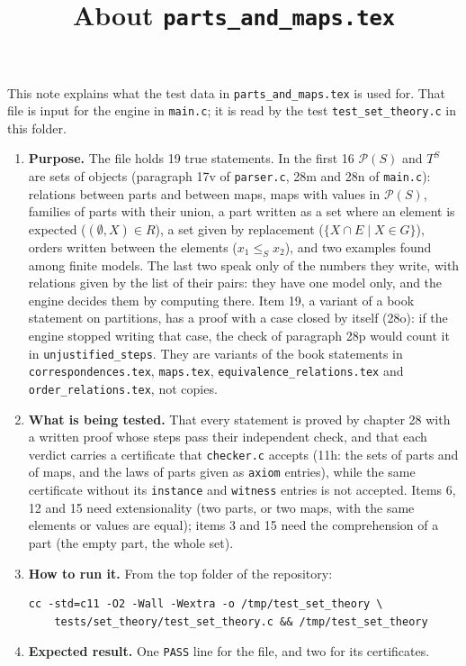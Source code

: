 \documentclass[11pt,a4paper]{article}
\title{About \texttt{parts\_and\_maps.tex}}
\author{}
\date{}
\begin{document}
\maketitle
This note explains what the test data in \texttt{parts\_and\_maps.tex} is used for. That file is input for the engine in \texttt{main.c}; it is read by the test \texttt{test\_set\_theory.c} in this folder.

\begin{enumerate}
\item \textbf{Purpose.} The file holds 19 true statements. In the first 16 $\mathcal{P}(S)$ and $T^{S}$ are sets of objects (paragraph 17v of \texttt{parser.c}, 28m and 28n of \texttt{main.c}): relations between parts and between maps, maps with values in $\mathcal{P}(S)$, families of parts with their union, a part written as a set where an element is expected ($(\emptyset, X) \in R$), a set given by replacement ($\{X \cap E \mid X \in G\}$), orders written between the elements ($x_{1} \le_{S} x_{2}$), and two examples found among finite models. The last two speak only of the numbers they write, with relations given by the list of their pairs: they have one model only, and the engine decides them by computing there. Item 19, a variant of a book statement on partitions, has a proof with a case closed by itself (28o): if the engine stopped writing that case, the check of paragraph 28p would count it in \texttt{unjustified\_steps}. They are variants of the book statements in \texttt{correspondences.tex}, \texttt{maps.tex}, \texttt{equivalence\_relations.tex} and \texttt{order\_relations.tex}, not copies.

\item \textbf{What is being tested.} That every statement is proved by chapter 28 with a written proof whose steps pass their independent check, and that each verdict carries a certificate that \texttt{checker.c} accepts (11h: the sets of parts and of maps, and the laws of parts given as \texttt{axiom} entries), while the same certificate without its \texttt{instance} and \texttt{witness} entries is not accepted. Items 6, 12 and 15 need extensionality (two parts, or two maps, with the same elements or values are equal); items 3 and 15 need the comprehension of a part (the empty part, the whole set).

\item \textbf{How to run it.} From the top folder of the repository:
\begin{verbatim}
cc -std=c11 -O2 -Wall -Wextra -o /tmp/test_set_theory \
    tests/set_theory/test_set_theory.c && /tmp/test_set_theory
\end{verbatim}

\item \textbf{Expected result.} One \texttt{PASS} line for the file, and two for its certificates.
\end{enumerate}
\end{document}
